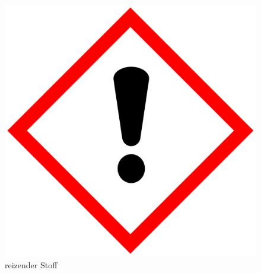 \begin{figure}[h]
\begin{center}
\begin{minipage}[t]{0.25\textwidth}
\begin{center}
                \includegraphics[height=0.1\textheight]{Bilder/Optische_Wellenleiter_Die_Polymer_Optische_Faser/Material_Polycarbonat/ausrufezeichnen.png}
                \caption[reizender Stoff \newline \url{https://de.wikipedia.org/wiki/Datei:GHS-pictogram-exclam.svg} (zuletzt aufgerufen am 11.10.2015)]{reizender Stoff}
                \label{fig:ausrufezeichen}
            \end{center}
        \end{minipage}
        \hspace{0.025\textwidth}
        \begin{minipage}[t]{0.25\textwidth}
            \begin{center}

\end{center}
\end{minipage}
\end{center}
\end{figure}
